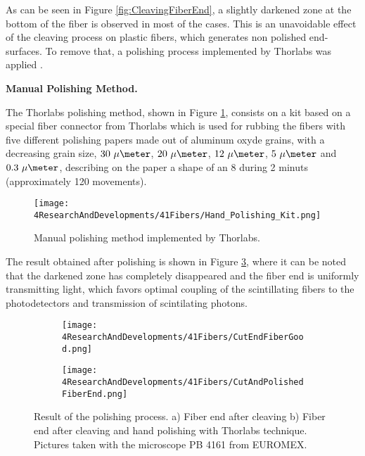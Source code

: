 As can be seen in Figure \ref{fig:CleavingFiberEnd}, a slightly darkened zone at the bottom of the fiber is observed in most of the cases. This is an unavoidable effect of the cleaving process on plastic fibers, which generates non polished end-surfaces. To remove that, a polishing process implemented by Thorlabs was applied \cite{DiamondThorlabs}. 

\textbf{Manual Polishing Method.}

The Thorlabs polishing method, shown in Figure \ref{fig:HandPolishingMethod}, consists on a kit based on a special fiber connector from Thorlabs which is used for rubbing the fibers with five different polishing papers made out of aluminum  oxyde grains, with a decreasing grain size, $30~\mu\meter$, $20~\mu\meter$, $12~\mu\meter$, $5~\mu\meter$ and $0.3~\mu\meter$, describing on the paper a shape of an 8 during 2 minuts (approximately 120 movements). 

\begin{figure}[h]
\centering
\texttt{[image: 4ResearchAndDevelopments/41Fibers/Hand\_Polishing\_Kit.png]}
\caption{Manual polishing method implemented by Thorlabs.\label{fig:HandPolishingMethod}}
\end{figure}

The result obtained after polishing is shown in Figure \ref{subfig:PolishFiberEnd}, where it can be noted that the darkened zone has completely disappeared and the fiber end is uniformly transmitting light, which favors optimal coupling of the scintillating fibers to the photodetectors and transmission of scintilating photons.

\begin{figure}
\centering
    \begin{subfigure}[b]{0.5\textwidth}
    \centering
    \texttt{[image: 4ResearchAndDevelopments/41Fibers/CutEndFiberGood.png]}  
    \caption{\label{subfig:CleaveFiberEnd}}
    \end{subfigure}
    \hfill
    \begin{subfigure}[b]{0.45\textwidth}
    \centering
    \texttt{[image: 4ResearchAndDevelopments/41Fibers/CutAndPolishedFiberEnd.png]}  
    \caption{\label{subfig:PolishFiberEnd}}
    \end{subfigure}
 \caption{Result of the polishing process. a) Fiber end after cleaving b) Fiber end after cleaving and hand polishing with Thorlabs technique. Pictures taken with the microscope PB 4161 from EUROMEX.}
 \label{fig:ResultofPolishingProcess}
\end{figure}

